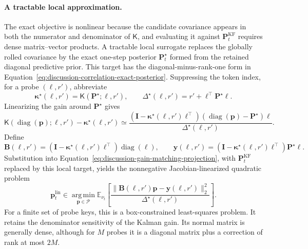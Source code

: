 \documentclass[11pt]{article}
\newcommand{\vct}[1]{\boldsymbol{#1}}
\newcommand{\diag}{\operatorname{diag}}
\begin{document}
\paragraph{A tractable local approximation.}
The exact objective is nonlinear because the candidate covariance appears in both the numerator
and denominator of $\mathsf{K}$, and evaluating it against
$\vct{P}_t^{\mathrm{KF}}$ requires dense matrix--vector products. A tractable local surrogate
replaces the globally rolled covariance by the exact one-step posterior $\vct{P}_t^\star$ formed
from the retained diagonal predictive prior. This target has the diagonal-minus-rank-one form in
Equation~\eqref{eq:discussion-correlation-exact-posterior}. Suppressing the token index, for a probe
$(\vct{\ell},r')$, abbreviate
\begin{equation}
  \vct{\kappa}^\star(\vct{\ell},r')
  =\mathsf{K}(\vct{P}^\star;\vct{\ell},r'),
  \qquad
  \Delta^\star(\vct{\ell},r')
  =r'+\vct{\ell}^\top\vct{P}^\star\vct{\ell}.
  \label{eq:discussion-probe-gain-notation}
\end{equation}
Linearizing the gain around $\vct{P}^\star$ gives
\begin{equation}
  \mathsf{K}(\diag(\vct{p});\vct{\ell},r')
  -\vct{\kappa}^\star(\vct{\ell},r')
  \simeq
  \frac{
    (\vct{I}-\vct{\kappa}^\star(\vct{\ell},r')\vct{\ell}^\top)
    (\diag(\vct{p})-\vct{P}^\star)\vct{\ell}}
    {\Delta^\star(\vct{\ell},r')}.
  \label{eq:discussion-gain-linearization}
\end{equation}
Define
\begin{equation}
  \vct{B}(\vct{\ell},r')
  =(\vct{I}-\vct{\kappa}^\star(\vct{\ell},r')\vct{\ell}^\top)
    \diag(\vct{\ell}),
  \qquad
  \vct{y}(\vct{\ell},r')
  =(\vct{I}-\vct{\kappa}^\star(\vct{\ell},r')\vct{\ell}^\top)
    \vct{P}^\star\vct{\ell}.
  \label{eq:discussion-gain-linearization-design}
\end{equation}
Substitution into Equation~\eqref{eq:discussion-gain-matching-projection}, with
$\vct{P}_t^{\mathrm{KF}}$ replaced by this local target, yields the nonnegative
Jacobian-linearized quadratic problem
\begin{equation}
  \vct{p}_t^{\mathrm{lin}}
  \in\operatorname*{arg\,min}_{\vct{p}\in\mathcal{P}}
    \mathbb{E}_{\nu_t}\!\left[
      \frac{\|\vct{B}(\vct{\ell},r')\vct{p}
       -\vct{y}(\vct{\ell},r')\|_2^2}
      {\Delta^\star(\vct{\ell},r')}
    \right].
  \label{eq:discussion-linearized-gain-projection}
\end{equation}
For a finite set of probe keys, this is a box-constrained least-squares problem. It retains
the denominator sensitivity of the Kalman gain. Its normal matrix is generally dense, although for
$M$ probes it is a diagonal matrix plus a correction of rank at most $2M$.
\end{document}
